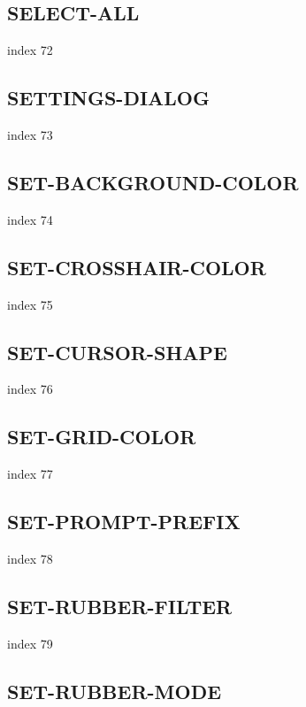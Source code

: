 \documentclass[a4paper]{report}
\begin{document}
\subsection{SELECT-ALL}

index 72

\subsection{SETTINGS-DIALOG}

index 73

\subsection{SET-BACKGROUND-COLOR}

index 74

\subsection{SET-CROSSHAIR-COLOR}

index 75

\subsection{SET-CURSOR-SHAPE}

index 76

\subsection{SET-GRID-COLOR}

index 77

\subsection{SET-PROMPT-PREFIX}

index 78

\subsection{SET-RUBBER-FILTER}

index 79

\subsection{SET-RUBBER-MODE}
\end{document}
